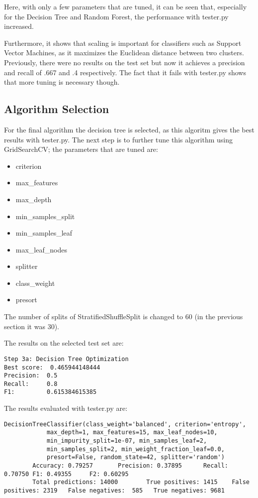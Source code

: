 \documentclass[11pt]{article} %
\begin{document}
Here, with only a few parameters that are tuned, it can be seen that, especially for the Decision Tree and Random Forest, the performance with tester.py increased.\medskip

Furthermore, it shows that scaling is important for classifiers such as Support Vector Machines, as it maximizes the Euclidean distance between two clusters. Previously, there were no results on the test set but now it achieves a precision and recall of .667 and .4 respectively. The fact that it fails with tester.py shows that more tuning is necessary though.\medskip

\subsection{Algorithm Selection}
For the final algorithm the decision tree is selected, as this algoritm gives the best results with tester.py. The next step is to further tune this algorithm using {\selectfont GridSearchCV}; the parameters that are tuned are:
\begin{itemize}
\item criterion
\item  max\_features
\item  max\_depth
\item  min\_samples\_split
\item  min\_samples\_leaf
\item  max\_leaf\_nodes
\item  splitter
\item  class\_weight
\item  presort
\end{itemize}
The number of splits of {\selectfont StratifiedShuffleSplit} is changed to 60 (in the previous section it was 30).\medskip

The results on the selected test set are:
\begin{verbatim}
Step 3a: Decision Tree Optimization
Best score:  0.465944148444
Precision:  0.5
Recall:     0.8
F1:         0.615384615385
\end{verbatim}

The results evaluated with tester.py are:
{\tiny
\begin{verbatim}
DecisionTreeClassifier(class_weight='balanced', criterion='entropy',
            max_depth=1, max_features=15, max_leaf_nodes=10,
            min_impurity_split=1e-07, min_samples_leaf=2,
            min_samples_split=2, min_weight_fraction_leaf=0.0,
            presort=False, random_state=42, splitter='random')
        Accuracy: 0.79257       Precision: 0.37895      Recall: 0.70750 F1: 0.49355     F2: 0.60295
        Total predictions: 14000        True positives: 1415    False positives: 2319   False negatives:  585   True negatives: 9681
\end{verbatim}
}
\end{document}
